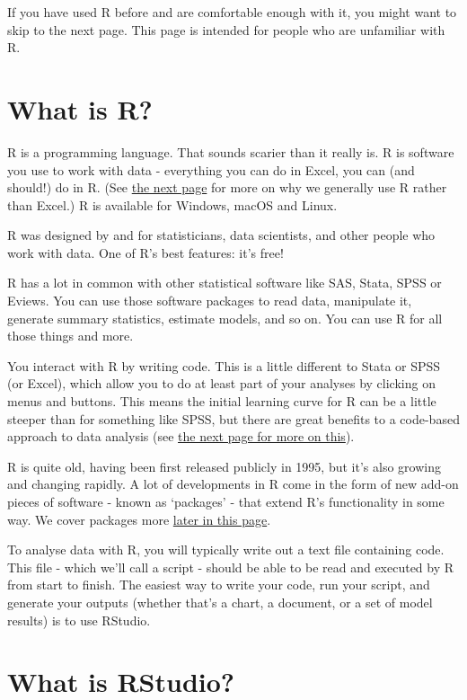 \documentclass[]{book}
\begin{document}
If you have used R before and are comfortable enough with it, you might want to skip to the next page. This page is intended for people who are unfamiliar with R.

\hypertarget{what-is-r}{%
\section{What is R?}\label{what-is-r}}

R is a programming language. That sounds scarier than it really is. R is software you use to work with data - everything you can do in Excel, you can (and should!) do in R. (See \protect\hyperlink{why-script}{the next page} for more on why we generally use R rather than Excel.) R is available for Windows, macOS and Linux.

R was designed by and for statisticians, data scientists, and other people who work with data. One of R's best features: it's free!

R has a lot in common with other statistical software like SAS, Stata, SPSS or Eviews. You can use those software packages to read data, manipulate it, generate summary statistics, estimate models, and so on. You can use R for all those things and more.

You interact with R by writing code. This is a little different to Stata or SPSS (or Excel), which allow you to do at least part of your analyses by clicking on menus and buttons. This means the initial learning curve for R can be a little steeper than for something like SPSS, but there are great benefits to a code-based approach to data analysis (see \protect\hyperlink{why-script}{the next page for more on this}).

R is quite old, having been first released publicly in 1995, but it's also growing and changing rapidly. A lot of developments in R come in the form of new add-on pieces of software - known as `packages' - that extend R's functionality in some way. We cover packages more \protect\hyperlink{packages}{later in this page}.

To analyse data with R, you will typically write out a text file containing code. This file - which we'll call a script - should be able to be read and executed by R from start to finish. The easiest way to write your code, run your script, and generate your outputs (whether that's a chart, a document, or a set of model results) is to use RStudio.

\hypertarget{what-is-rstudio}{%
\section{What is RStudio?}\label{what-is-rstudio}}
\end{document}
